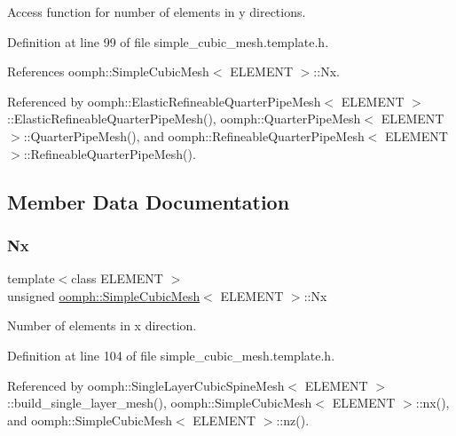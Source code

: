 Access function for number of elements in y directions. 



Definition at line 99 of file simple\+\_\+cubic\+\_\+mesh.\+template.\+h.



References oomph\+::\+Simple\+Cubic\+Mesh$<$ E\+L\+E\+M\+E\+N\+T $>$\+::\+Nx.



Referenced by oomph\+::\+Elastic\+Refineable\+Quarter\+Pipe\+Mesh$<$ E\+L\+E\+M\+E\+N\+T $>$\+::\+Elastic\+Refineable\+Quarter\+Pipe\+Mesh(), oomph\+::\+Quarter\+Pipe\+Mesh$<$ E\+L\+E\+M\+E\+N\+T $>$\+::\+Quarter\+Pipe\+Mesh(), and oomph\+::\+Refineable\+Quarter\+Pipe\+Mesh$<$ E\+L\+E\+M\+E\+N\+T $>$\+::\+Refineable\+Quarter\+Pipe\+Mesh().



\subsection{Member Data Documentation}
\mbox{\label{classoomph_1_1SimpleCubicMesh_aad51fb31a4f31f2681740793a07594e9}} 
\subsubsection{\texorpdfstring{Nx}{Nx}}
{\footnotesize\ttfamily template$<$class E\+L\+E\+M\+E\+NT $>$ \\
unsigned \hyperlink{classoomph_1_1SimpleCubicMesh}{oomph\+::\+Simple\+Cubic\+Mesh}$<$ E\+L\+E\+M\+E\+NT $>$\+::Nx\hspace{0.3cm}{\ttfamily [protected]}}



Number of elements in x direction. 



Definition at line 104 of file simple\+\_\+cubic\+\_\+mesh.\+template.\+h.



Referenced by oomph\+::\+Single\+Layer\+Cubic\+Spine\+Mesh$<$ E\+L\+E\+M\+E\+N\+T $>$\+::build\+\_\+single\+\_\+layer\+\_\+mesh(), oomph\+::\+Simple\+Cubic\+Mesh$<$ E\+L\+E\+M\+E\+N\+T $>$\+::nx(), and oomph\+::\+Simple\+Cubic\+Mesh$<$ E\+L\+E\+M\+E\+N\+T $>$\+::nz().

\mbox{\label{classoomph_1_1SimpleCubicMesh_a084445d7cbea1c3d1d67739934bbd6ec}} 
